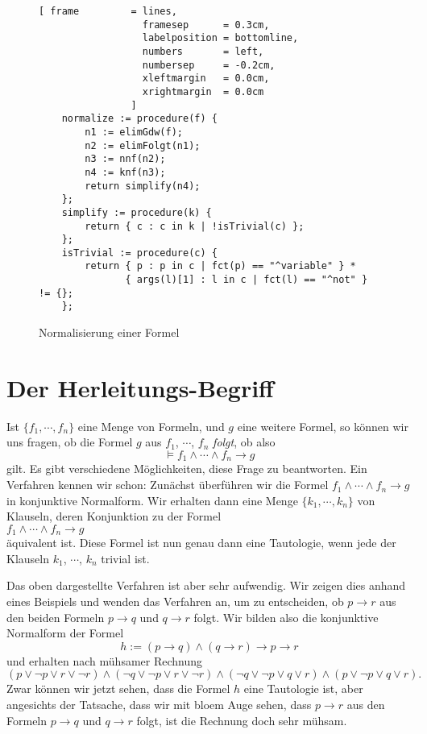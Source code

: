 \begin{figure}[!ht]
  \centering
\begin{Verbatim}[ frame         = lines, 
                  framesep      = 0.3cm, 
                  labelposition = bottomline,
                  numbers       = left,
                  numbersep     = -0.2cm,
                  xleftmargin   = 0.0cm,
                  xrightmargin  = 0.0cm
                ]
    normalize := procedure(f) {
        n1 := elimGdw(f);
        n2 := elimFolgt(n1);
        n3 := nnf(n2);
        n4 := knf(n3);
        return simplify(n4);
    };
    simplify := procedure(k) {
        return { c : c in k | !isTrivial(c) };
    };
    isTrivial := procedure(c) {
        return { p : p in c | fct(p) == "^variable" } * 
               { args(l)[1] : l in c | fct(l) == "^not" } != {};
    };
\end{Verbatim} 
\vspace*{-0.3cm}
  \caption{Normalisierung einer Formel}
  \label{fig:normalize}
\end{figure}
\vspace*{\fill}


\section{Der Herleitungs-Begriff}
Ist $\{f_1,\cdots,f_n\}$ eine Menge von Formeln, und $g$ eine weitere Formel, so
k\"{o}nnen wir uns fragen, ob  die  Formel $g$ aus $f_1$, $\cdots$, $f_n$ \emph{folgt}, ob
also 
\[ \models f_1 \wedge \cdots \wedge f_n \rightarrow g \]
gilt.
Es gibt verschiedene M\"{o}glichkeiten, diese Frage zu beantworten.  Ein Verfahren kennen wir
schon: Zun\"{a}chst \"{u}berf\"{u}hren wir die Formel  $f_1 \wedge \cdots \wedge f_n \rightarrow g$ in
konjunktive Normalform.  Wir erhalten dann eine Menge
$\{k_1,\cdots,k_n\}$ von Klauseln, deren Konjunktion zu der  Formel
\\[0.2cm]
\hspace*{1.3cm} $f_1 \wedge \cdots \wedge f_n \rightarrow g$
\\[0.2cm] 
\"{a}quivalent ist.  Diese Formel ist nun genau dann eine Tautologie, wenn
jede der Klauseln $k_1$, $\cdots$, $k_n$ trivial ist.  

Das oben dargestellte Verfahren ist aber sehr aufwendig.  Wir zeigen dies anhand eines
Beispiels und wenden das Verfahren
an, um zu entscheiden, ob $p \rightarrow r$ aus den beiden Formeln $p \rightarrow q$ und
$q \rightarrow r$ folgt.   Wir bilden also die konjunktive Normalform der Formel 
\[ h := (p \rightarrow q) \wedge (q \rightarrow r) \rightarrow p \rightarrow r
\]
und erhalten nach m\"{u}hsamer Rechnung
\[
   (p \vee \neg p \vee r \vee \neg r) \wedge (\neg q \vee \neg p \vee r \vee \neg r) \wedge
   (\neg q \vee \neg p \vee q \vee r) \wedge (p \vee \neg p \vee q \vee r). 
\]
Zwar k\"{o}nnen wir jetzt sehen, dass die Formel $h$ eine Tautologie ist, aber angesichts der
Tatsache, dass wir mit blo\3em Auge sehen, dass  $p \rightarrow r$ aus den Formeln $p \rightarrow q$ und
$q \rightarrow r$ folgt, ist die Rechnung  doch  sehr m\"{u}hsam.

